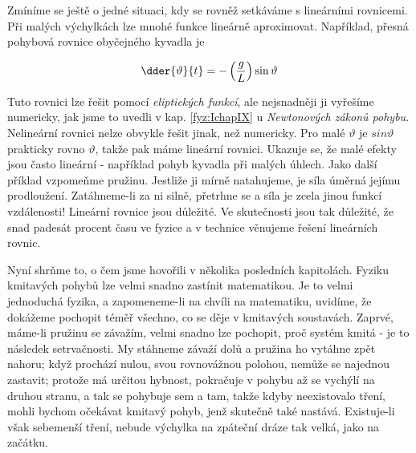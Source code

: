     Zmíníme se ještě o jedné situaci, kdy se rovněž setkáváme s lineárními rovnicemi. Při malých 
    výchylkách lze mnohé funkce lineárně aproximovat. Například, přesná pohybová rovnice obyčejného 
    kyvadla je
    
    \begin{equation}\label{fyz:eq346}
      \dder{\vartheta}{t} = - \left(\dfrac{g}{L}\right)\sin\vartheta
    \end{equation}
    
    Tuto rovnici lze řešit pomocí \emph{eliptických funkcí}, ale nejsnadněji ji vyřešíme numericky, 
    jak jsme to uvedli v kap. \ref{fyz:IchapIX} u \emph{Newtonových zákonů pohybu}. Nelineární 
    rovnici nelze obvykle řešit jinak, než numericky. Pro malé \(\vartheta\) je \(sin\vartheta\) 
    prakticky rovno \(\vartheta\), takže pak máme lineární rovnici. Ukazuje se, že malé efekty jsou 
    často lineární - například pohyb kyvadla při malých úhlech. Jako další příklad vzpomeňme 
    pružinu. Jestliže ji mírně natahujeme, je síla úměrná jejímu prodloužení. Zatáhneme-li za ni 
    silně, přetrhne se a síla je zcela jinou funkcí vzdálenosti! Lineární rovnice jsou důležité. Ve 
    skutečnosti jsou tak důležité, že snad padesát procent času ve fyzice a v technice věnujeme 
    řešení lineárních rovnic.
    
    Nyní shrňme to, o čem jsme hovořili v několika posledních kapitolách. Fyziku kmitavých pohybů 
    lze velmi snadno zastínit matematikou. Je to velmi jednoduchá fyzika, a zapomeneme-li na chvíli 
    na matematiku, uvidíme, že dokážeme pochopit téměř všechno, co se děje v kmitavých soustavách. 
    Zaprvé, máme-li pružinu se závažím, velmi snadno lze pochopit, proč systém kmitá - je to 
    následek setrvačnosti. My stáhneme závaží dolů a pružina ho vytáhne zpět nahoru; když prochází 
    nulou, svou rovnovážnou polohou, nemůže se najednou zastavit; protože má určitou hybnost, 
    pokračuje v pohybu až se vychýlí na druhou stranu, a tak se pohybuje sem a tam, takže kdyby 
    neexistovalo tření, mohli bychom očekávat kmitavý pohyb, jenž skutečně také nastává. 
    Existuje-li však sebemenší tření, nebude výchylka na zpáteční dráze tak velká, jako na začátku.
    
